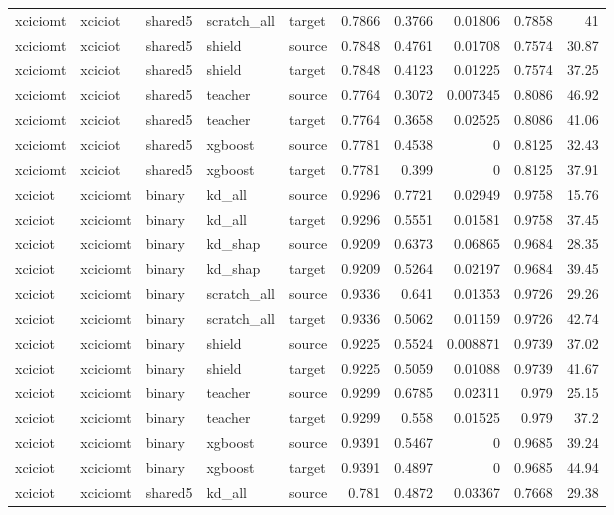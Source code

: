 \begin{table}
\begin{tabular}{lllllrrrrr}
xciciomt & xciciot & shared5 & scratch_all & target & 0.7866 & 0.3766 & 0.01806 & 0.7858 & 41 \\
xciciomt & xciciot & shared5 & shield & source & 0.7848 & 0.4761 & 0.01708 & 0.7574 & 30.87 \\
xciciomt & xciciot & shared5 & shield & target & 0.7848 & 0.4123 & 0.01225 & 0.7574 & 37.25 \\
xciciomt & xciciot & shared5 & teacher & source & 0.7764 & 0.3072 & 0.007345 & 0.8086 & 46.92 \\
xciciomt & xciciot & shared5 & teacher & target & 0.7764 & 0.3658 & 0.02525 & 0.8086 & 41.06 \\
xciciomt & xciciot & shared5 & xgboost & source & 0.7781 & 0.4538 & 0 & 0.8125 & 32.43 \\
xciciomt & xciciot & shared5 & xgboost & target & 0.7781 & 0.399 & 0 & 0.8125 & 37.91 \\
xciciot & xciciomt & binary & kd_all & source & 0.9296 & 0.7721 & 0.02949 & 0.9758 & 15.76 \\
xciciot & xciciomt & binary & kd_all & target & 0.9296 & 0.5551 & 0.01581 & 0.9758 & 37.45 \\
xciciot & xciciomt & binary & kd_shap & source & 0.9209 & 0.6373 & 0.06865 & 0.9684 & 28.35 \\
xciciot & xciciomt & binary & kd_shap & target & 0.9209 & 0.5264 & 0.02197 & 0.9684 & 39.45 \\
xciciot & xciciomt & binary & scratch_all & source & 0.9336 & 0.641 & 0.01353 & 0.9726 & 29.26 \\
xciciot & xciciomt & binary & scratch_all & target & 0.9336 & 0.5062 & 0.01159 & 0.9726 & 42.74 \\
xciciot & xciciomt & binary & shield & source & 0.9225 & 0.5524 & 0.008871 & 0.9739 & 37.02 \\
xciciot & xciciomt & binary & shield & target & 0.9225 & 0.5059 & 0.01088 & 0.9739 & 41.67 \\
xciciot & xciciomt & binary & teacher & source & 0.9299 & 0.6785 & 0.02311 & 0.979 & 25.15 \\
xciciot & xciciomt & binary & teacher & target & 0.9299 & 0.558 & 0.01525 & 0.979 & 37.2 \\
xciciot & xciciomt & binary & xgboost & source & 0.9391 & 0.5467 & 0 & 0.9685 & 39.24 \\
xciciot & xciciomt & binary & xgboost & target & 0.9391 & 0.4897 & 0 & 0.9685 & 44.94 \\
xciciot & xciciomt & shared5 & kd_all & source & 0.781 & 0.4872 & 0.03367 & 0.7668 & 29.38 \\

\end{tabular}
\end{table}
